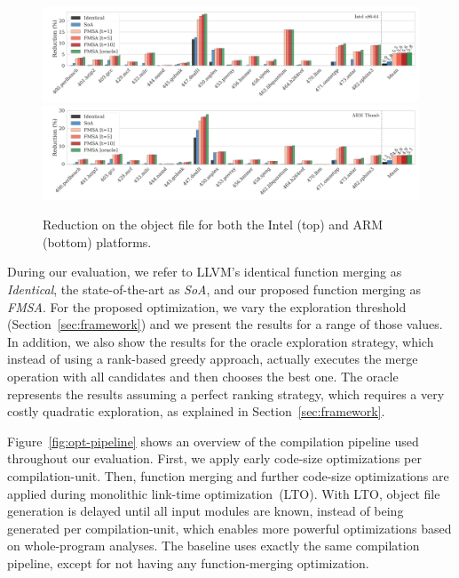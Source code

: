 \begin{figure}[t!]
  \centering
  \includegraphics[width=\linewidth]{figs/reduction-obj-intel-label.pdf} \\
  \vspace{-1.8ex}
  \includegraphics[width=\linewidth]{figs/reduction-obj-arm-label.pdf}
  \vspace{-4ex}
  \caption{Reduction on the object file for both the Intel (top) and ARM (bottom) platforms.}
  \label{fig:reduction-obj}
\end{figure}


During our evaluation, we refer to LLVM's identical function merging as \textit{Identical}, the state-of-the-art as \textit{SoA}, and our
proposed function merging as \textit{FMSA}. For the proposed optimization, we vary the exploration threshold (Section~\ref{sec:framework})
and we present the results for a range of those values. In addition, we also show the results for the oracle exploration strategy, which
instead of using a rank-based greedy approach, actually executes the merge operation with all candidates and then chooses the best one.
The oracle represents the results assuming a perfect ranking strategy, which requires a very costly quadratic exploration, as explained in
Section~\ref{sec:framework}. 

Figure~\ref{fig:opt-pipeline} shows an overview of the compilation pipeline used
throughout our evaluation.
First, we apply early code-size optimizations per compilation-unit.
Then, function merging and further code-size optimizations are applied during
monolithic link-time optimization~(LTO).
With LTO, object file generation is delayed until all input modules are known,
instead of being generated per compilation-unit, which enables more powerful
optimizations based on whole-program analyses.
The baseline uses exactly the same compilation pipeline, except for not having
any function-merging optimization.

